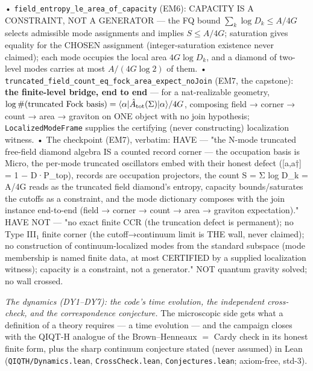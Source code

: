 \documentclass[11pt,a4paper]{article}
\begin{document}
  • \texttt{field\_entropy\_le\_area\_of\_capacity} (EM6): CAPACITY IS A CONSTRAINT, NOT A GENERATOR — the FQ bound $\sum_k \log D_k \le A/4G$ selects admissible mode assignments and implies $S \le A/4G$; saturation gives equality for the CHOSEN assignment (integer-saturation existence never claimed); each mode occupies the local area $4G\log D_k$, and a diamond of two-level modes carries at most $A/(4G\log 2)$ of them.
  • \texttt{truncated\_field\_count\_eq\_fock\_area\_expect\_noJoin} (EM7, the capstone): \textbf{the finite-level bridge, end to end} — for a nat-realizable geometry, $\log\#(\text{truncated Fock basis}) = \langle\alpha|\hat A_{\rm tot}(\Sigma)|\alpha\rangle/4G$, composing field → corner → count → area → graviton on ONE object with no join hypothesis; \texttt{LocalizedModeFrame} supplies the certifying (never constructing) localization witness.
  • The checkpoint (EM7), verbatim: HAVE — "the N-mode truncated free-field diamond algebra IS a counted record corner — the occupation basis is Micro, the per-mode truncated oscillators embed with their honest defect ([a,a†] = 1 − D·P\_top), records are occupation projectors, the count S = Σ log D\_k = A/4G reads as the truncated field diamond's entropy, capacity bounds/saturates the cutoffs as a constraint, and the mode dictionary composes with the join instance end-to-end (field → corner → count → area → graviton expectation)." HAVE NOT — "no exact finite CCR (the truncation defect is permanent); no Type III₁ finite corner (the cutoff→continuum limit is THE wall, never claimed); no construction of continuum-localized modes from the standard subspace (mode membership is named finite data, at most CERTIFIED by a supplied localization witness); capacity is a constraint, not a generator." NOT quantum gravity solved; no wall crossed.

\emph{The dynamics (DY1--DY7): the code's time evolution, the independent cross-check, and the correspondence conjecture.} The microscopic side gets what a definition of a theory requires — a time evolution — and the campaign closes with the QIQT-H analogue of the Brown--Henneaux $=$ Cardy check in its honest finite form, plus the sharp continuum conjecture stated (never assumed) in Lean (\texttt{QIQTH/Dynamics.lean}, \texttt{CrossCheck.lean}, \texttt{Conjectures.lean}; axiom-free, std-3).
\end{document}
